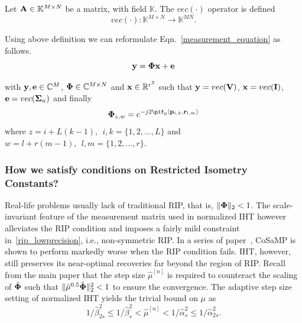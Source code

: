 \documentclass{article}
\begin{document}
\begin{definition}
Let ${\bf A} \in \mathbb{K}^{M\times N}$ be a matrix, with field ${\mathbb{K}}$. The $vec(\cdot)$ operator is defined
\begin{equation*}
    {vec(\cdot)}: \mathbb{K}^{M\times N} \rightarrow \mathbb{K}^{MN}.
\end{equation*}
\end{definition}

Using above definition we can reformulate Eqn.~\ref{measurement_equation} as follows.
\begin{equation}
    {\bf y} = {\bf \Phi}{\bf x} + {\bf e}
\end{equation}

with ${\bf y}, {\bf e} \in \mathbb{C}^{M}$, ${\bf \Phi} \in \mathbb{C}^{M\times N}$ and ${\bf x} \in \mathbb{R}^{r^2}$ such that ${\bf y} = vec({\bf V})$, ${\bf x} = vec({\bf I})$, ${\bf e} = vec(\boldsymbol{\Sigma}_n)$ and finally
\begin{equation}
    {\bf \Phi}_{z,w} = e^{-j2\pif_0 \langle {\bf p}_{i, k}, {\bf r}_{l, m} \rangle } 
\end{equation}
where $z = i + L(k-1), \ \ i, k = \{1, 2, ..., L\}$ and $w = l + r(m-1), \ \ l, m = \{1, 2, ..., r\}$.

\subsubsection{How we satisfy conditions on Restricted Isometry Constants?}
Real-life problems usually lack of traditional RIP, that is, $\|{\bf \Phi}\|_2 < 1$. The scale-invariant feature of the measurement matrix used in normalized IHT however alleviates the RIP condition and imposes a fairly mild constraint in~\ref{rip_lowprecision}, i.e., non-symmetric RIP. In a series of paper~\cite{blumensath2010niht, blumensath2012greedy}, CoSaMP is shown to perform markedly worse when the RIP condition fails. IHT, however, still preserves its near-optimal recoveries far beyond the region of RIP. %
Recall from the main paper that the step size $\hat{\mu}^{[n]}$ is required to counteract the scaling of $\hat{{\bf \Phi}}$ such that $\|\hat{\mu}^{0.5} \hat{\bf\Phi}\|_2^2 <1$ to ensure the convergence. 
The adaptive step size setting of normalized IHT yields the trivial bound on $\mu$ as~\cite{blumensath2012greedy}
\begin{equation}
   1/\hat{\beta}_{2s}^2\leq  1/\hat{\beta}_s^2 < \hat{\mu}^{[n]} < 1/\hat{\alpha}_s^2 \leq 1/\hat{\alpha}_{2s}^2.
\end{equation}
\end{document}
